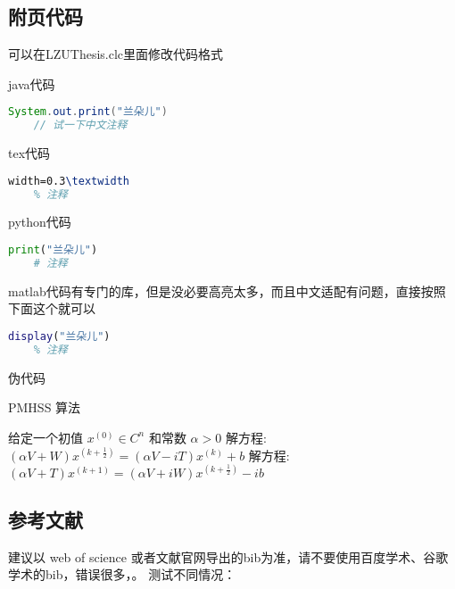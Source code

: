 \documentclass[AutoFakeBold]{LZUThesis}
\begin{document}
\subsection{附页代码}
\label{sub:附页代码}
可以在LZUThesis.clc里面修改代码格式

java代码
\begin{lstlisting}[language = java]
    System.out.print("兰朵儿")
    // 试一下中文注释
\end{lstlisting}


tex代码
\begin{lstlisting}[language = tex]
    width=0.3\textwidth
    % 注释
\end{lstlisting}

python代码
\begin{lstlisting}[language = python]
    print("兰朵儿")
    # 注释
\end{lstlisting}

matlab代码有专门的库，但是没必要高亮太多，而且中文适配有问题，直接按照下面这个就可以
\begin{lstlisting}[language = matlab]
    display("兰朵儿")
    % 注释
\end{lstlisting}


伪代码

\begin{algorithm}[H]
    \caption{PMHSS 算法\label{Alg:PMHSS}}
    \begin{algorithmic}[1]
        \State 给定一个初值 $ x^{(0)} \in C^{n} $  和常数 $\alpha>0$
        \State 解方程: $(\alpha V+W)x^{(k+\frac{1}{2})}=(\alpha V-i T)x^{(k)}+b $
        \State 解方程: $(\alpha V+T)x^{(k+1)}=(\alpha V+i W)x^{(k+\frac{1}{2})}-i b$
        \EndFor
    \end{algorithmic}
\end{algorithm}

\subsection{参考文献}
\label{sub:参考文献}

建议以 web of science 或者文献官网导出的bib为准，请不要使用百度学术、谷歌学术的bib，错误很多，\cite{partl2016, tenne1992polyhedral, tussyadiah2015hotels}。
测试不同情况：
\end{document}

